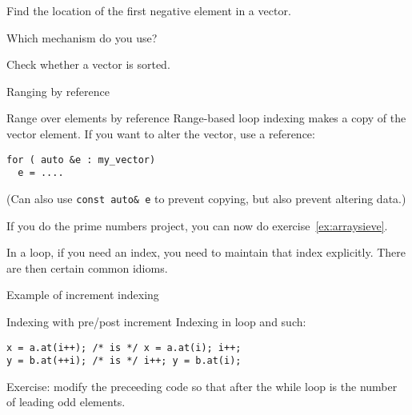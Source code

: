 \begin{exercise}
  \label{ex:array-maxidx}
  Find the location of the first negative element in a vector.

  Which mechanism do you use?
\end{exercise}

\begin{exercise}
  \label{ex:array-sorted}
  Check whether a vector is sorted.
\end{exercise}

 {Ranging by reference}

\begin{block}{Range over elements by reference}
  \label{sl:vector-range-ref}
  Range-based loop indexing makes a copy of the vector element. If you
  want to alter the vector, use a reference:
\begin{lstlisting}
for ( auto &e : my_vector)
  e = ....
\end{lstlisting}
%

(Can also use \lstinline{const auto& e} to prevent copying, but also
prevent altering data.)
\end{block}

\begin{exercise}
  If you do the prime numbers project, you can now do exercise~\ref{ex:arraysieve}.
\end{exercise}

In a  loop, if you need an index,
you need to maintain that index explicitly.
There are then certain common idioms.

\begin{block}{Example of increment indexing}
  \label{sl:plusplusexample}
\end{block}

\begin{slide}{Indexing with pre/post increment}
  \label{sl:prepostindex}
Indexing in  loop and such:
\begin{lstlisting}
x = a.at(i++); /* is */ x = a.at(i); i++;
y = b.at(++i); /* is */ i++; y = b.at(i);
\end{lstlisting}
\end{slide}

\begin{exercise}
  Exercise: modify the preceeding code so that after the while loop
   is the number of leading odd elements.
\end{exercise}


